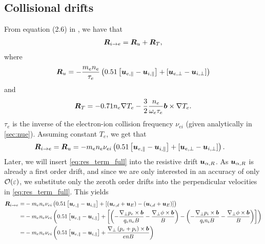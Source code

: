 \subsection{Collisional drifts}
\label{sec:collDrift}
%
From equation (2.6) in \cite{Braginskii1965}, we have that
%
\begin{align*}
    \boldsymbol{R}_{i \to e}
    =
    \boldsymbol{R}_{u} + \boldsymbol{R}_{T},
\end{align*}
%
where
%
\begin{align*}
    \boldsymbol{R}_{u}
    =
    -\frac{m_en_e}{\tau_e}\left(0.51\left[\boldsymbol{u}_{e,\|}-\boldsymbol{u}_{i,\|}\right] +
    \left[\boldsymbol{u}_{e,\perp}-\boldsymbol{u}_{i,\perp}\right]\right)
\end{align*}
%
and
%
\begin{align*}
    \boldsymbol{R}_{T}
    =
    -0.71n_e\nabla T_e -
    \frac{3}{2}\frac{n_e}{\omega_e\tau_e}\boldsymbol{b}\times\nabla T_e.
\end{align*}
%
$\tau_e$ is the inverse of the electron-ion collision frequency $\nu_{ei}$ (given analytically in \cref{sec:nue}).
Assuming constant $T_e$, we get that
%
\begin{align}
    \boldsymbol{R}_{i \to e}
    = \boldsymbol{R}_{u}
   &= -m_en_e\nu_{ei}\left(0.51\left[\boldsymbol{u}_{e,\|}-\boldsymbol{u}_{i,\|}\right] +
      \left[\boldsymbol{u}_{e,\perp}-\boldsymbol{u}_{i,\perp}\right]\right).
   \label{eq:res_term_full}
\end{align}
%
Later, we will insert \cref{eq:res_term_full} into the resistive drift $\boldsymbol{u}_{\alpha,R}$.
As $\boldsymbol{u}_{\alpha,R}$ is already a first order drift, and since we are only interested in an accuracy of only $\mathcal{O}(\varepsilon)$, we substitute only the zeroth order drifts into the perpendicular velocities in \cref{eq:res_term_full}.
This yields
%
\begin{align*}
    \ve{R}_{i \to e}
    =&
    -m_en_e\nu_{ei}
   \L( 0.51 \L[\ve{u}_{e,\|}-\ve{u}_{i,\|}\R] +
      \L[
         \L(
           \ve{u}_{e,d} + \ve{u}_E
          \R)
          -
         \L(
          \ve{u}_{i,d} + \ve{u}_E
         \R)
      \R]
   \R)
   \\
%
%
   =&
   -m_en_e\nu_{ei}
   \L( 0.51 \L[\ve{u}_{e,\|}-\ve{u}_{i,\|}\R] +
      \L[
         \L(
            -
            \frac{\grad_\perp p_e \times \ve{b}}{q_en_eB}
            -
            \frac{\grad_\perp \phi \times \ve{b}}{B}
          \R)
          -
         \L(
            -
            \frac{\grad_\perp p_i \times \ve{b}}{q_in_iB}
            -
          \frac{\grad_\perp \phi \times \ve{b}}{B}
         \R)
      \R]
   \R)
   \\
%
%
   =&
   -m_en_e\nu_{ei}
   \L(0.51\L[\ve{u}_{e,\|}-\ve{u}_{i,\|}\R] + \frac{\grad_\perp \L(p_e + p_i\R) \times \ve{b}}{enB}
  \R)
\end{align*}
